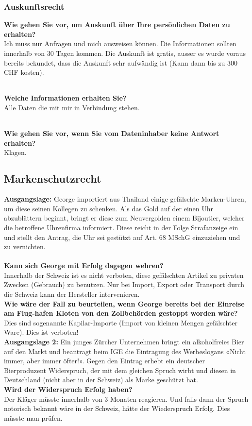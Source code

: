 \subsubsection{Auskunftsrecht}

\textbf{Wie gehen Sie vor, um Auskunft über Ihre persönlichen Daten zu
erhalten?}\\
Ich muss nur Anfragen und mich ausweisen können. Die Informationen
sollten innerhalb von 30 Tagen kommen. Die Auskunft ist gratis, ausser
es wurde voraus bereits bekundet, dass die Auskunft sehr aufwändig ist
(Kann dann bis zu 300 CHF kosten).

\mbox{}\\
\textbf{Welche Informationen erhalten Sie?}\\
Alle Daten die mit mir in Verbindung stehen.

\mbox{}\\
\textbf{Wie gehen Sie vor, wenn Sie vom Dateninhaber keine Antwort
erhalten?}\\
Klagen.

\subsection{Markenschutzrecht}

\textbf{Ausgangslage:} George importiert aus Thailand einige gefälschte
Marken-Uhren, um diese seinen Kollegen zu schenken. Als das Gold auf der
einen Uhr abzublättern beginnt, bringt er diese zum Neuvergolden einem
Bijoutier, welcher die betroffene Uhrenfirma informiert. Diese reicht in
der Folge Strafanzeige ein und stellt den Antrag, die Uhr sei gestützt
auf Art. 68 MSchG einzuziehen und zu vernichten.\\
\\
\textbf{Kann sich George mit Erfolg dagegen wehren?}\\
Innerhalb der Schweiz ist es nicht verboten, diese gefälschten Artikel
zu privaten Zwecken (Gebrauch) zu benutzen. Nur bei Import, Export oder
Transport durch die Schweiz kann der Hersteller intervenieren.\\

\textbf{Wie wäre der Fall zu beurteilen, wenn George bereits bei der
Einreise am Flug-hafen Kloten von den Zollbehörden gestoppt worden
wäre?}\\
Dies sind sogenannte Kapilar-Importe (Import von kleinen Mengen
gefälschter Ware). Dies ist verboten!\\

\textbf{Ausgangslage 2:} Ein junges Zürcher Unternehmen bringt ein
alkoholfreies Bier auf den Markt und beantragt beim IGE die Eintragung
des Werbeslogans «Nicht immer, aber immer öfter!». Gegen den Eintrag
erhebt ein deutscher Bierproduzent Widerspruch, der mit dem gleichen
Spruch wirbt und diesen in Deutschland (nicht aber in der Schweiz) als
Marke geschützt hat.\\

\textbf{Wird der Widerspruch Erfolg haben?}\\
Der Kläger müsste innerhalb von 3 Monaten reagieren. Und falls dann der
Spruch notorisch bekannt wäre in der Schweiz, hätte der Wiederspruch
Erfolg. Dies müsste man prüfen.

